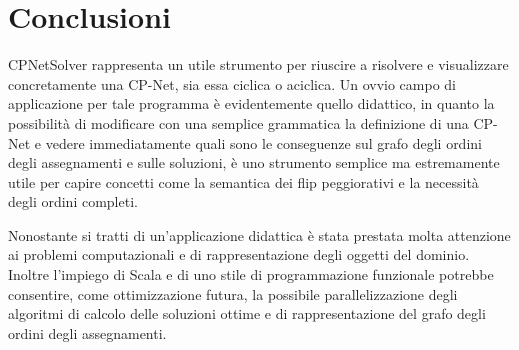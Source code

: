 \section{Conclusioni}
CPNetSolver rappresenta un utile strumento per riuscire a risolvere e
visualizzare concretamente una CP-Net, sia essa ciclica o aciclica. Un
ovvio campo di applicazione per tale programma è evidentemente quello
didattico, in quanto la possibilità di modificare con una semplice
grammatica la definizione di una CP-Net e vedere immediatamente quali
sono le conseguenze sul grafo degli ordini degli assegnamenti e sulle
soluzioni, è uno strumento semplice ma estremamente utile per capire
concetti come la semantica dei flip peggiorativi e la necessità degli
ordini completi.

Nonostante si tratti di un'applicazione didattica è stata prestata
molta attenzione ai problemi computazionali e di rappresentazione
degli oggetti del dominio. Inoltre l'impiego di Scala e di uno stile
di programmazione funzionale potrebbe consentire, come ottimizzazione
futura, la possibile parallelizzazione degli algoritmi di calcolo
delle soluzioni ottime e di rappresentazione del grafo degli ordini
degli assegnamenti.
